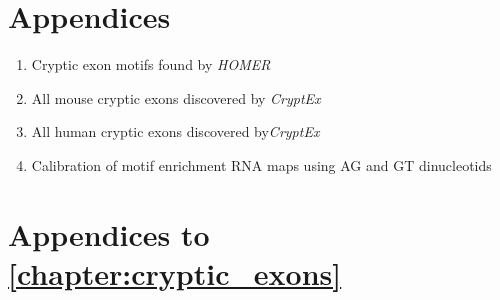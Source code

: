 
\begin{appendices}
	\section*{Appendices}
	\begin{enumerate}
		\item Cryptic exon motifs found by \textit{HOMER}\\
		\item All mouse cryptic exons discovered by \textit{CryptEx}\\ 
		\item All human cryptic exons discovered by\textit{CryptEx}\\
		
		\item Calibration of motif enrichment RNA maps using AG and GT dinucleotids
	\end{enumerate}

\clearpage	


\section{Appendices to \autoref{chapter:cryptic_exons} }


\end{appendices}
